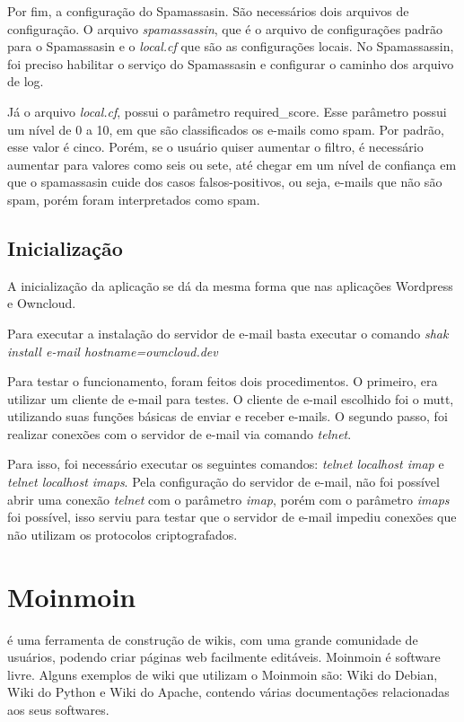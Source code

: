 Por fim, a configuração do Spamassasin. São necessários dois arquivos de configuração.
O arquivo \textit{spamassassin}, que é o arquivo de configurações padrão para o Spamassasin e o
\textit{local.cf} que são as configurações locais. No Spamassassin, foi preciso habilitar 
o serviço do Spamassasin e configurar o caminho dos arquivo de log.

Já o arquivo \textit{local.cf}, possui o parâmetro required\_score. Esse parâmetro 
possui um nível de 0 a 10, em que 
são classificados os e-mails como spam. Por padrão, esse valor é cinco. Porém, se 
o usuário quiser aumentar o filtro, é necessário aumentar para valores como seis ou sete, 
até chegar em um nível de confiança em que o spamassasin cuide dos casos falsos-positivos, 
ou seja, e-mails que não são spam, porém foram interpretados como spam.

\subsection{Inicialização}

A inicialização da aplicação se dá da mesma forma que nas aplicações Wordpress
e Owncloud.

Para executar a instalação do servidor de e-mail basta executar o comando \textit{
shak install e-mail hostname=owncloud.dev}

Para testar o funcionamento, foram feitos dois procedimentos. O primeiro, era utilizar
um cliente de e-mail para testes. O cliente de e-mail escolhido foi o mutt, utilizando
suas funções básicas de enviar e receber e-mails. O segundo passo, foi realizar conexões
com o servidor de e-mail via comando \textit{telnet}. 

Para isso, foi necessário executar os seguintes comandos: \textit{telnet localhost imap} e
\textit{telnet localhost imaps}. Pela configuração do servidor de e-mail, não foi possível abrir uma conexão 
\textit{telnet}
com o parâmetro \textit{imap}, porém com o parâmetro \textit{imaps} foi possível, isso serviu para testar 
que o servidor de e-mail impediu conexões que não 
utilizam os protocolos criptografados.

\section{Moinmoin}
\label{sub:moinmoin}

\cite{moin} é uma ferramenta de construção
de wikis, com uma grande comunidade de usuários, podendo criar páginas web
facilmente editáveis. Moinmoin é software livre. Alguns exemplos
de wiki que utilizam o Moinmoin são: Wiki do Debian, Wiki do Python e Wiki do Apache,
contendo várias documentações relacionadas aos seus softwares. 

